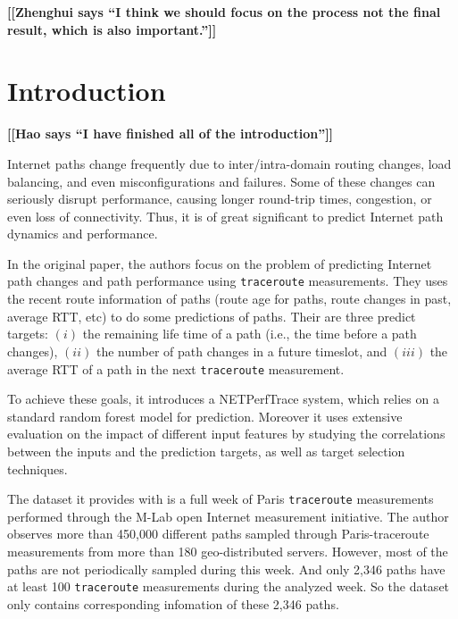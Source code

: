 \documentclass[sigconf]{acmart}
\newcommand{\hao}[1]{{\bf \color{red} [[Hao says ``#1'']]}}
\newcommand{\hui}[1]{{\bf \color{purple} [[Zhenghui says ``#1'']]}}
\begin{document}
	
	
	
	
	\maketitle
	\hui{I think we should focus on the process not the final result, which is also important.}
	\section{Introduction}
	\hao{I have finished all of the introduction}
	
	Internet paths change frequently due to inter/intra-domain routing changes, load balancing, and even misconfigurations and failures. Some of these changes can seriously disrupt performance, causing longer round-trip times, congestion, or even loss of connectivity. Thus, it is of great significant to predict Internet path dynamics and performance.
	
	In the original paper, the authors focus on the problem of predicting Internet path changes and path performance using \texttt{traceroute} measurements. They uses the recent route information of paths (route age for paths, route changes in past, average RTT, etc) to do some predictions of paths. Their are three predict targets: $(i)$ the remaining life time of a path (i.e., the time before a path changes), $(ii)$ the number of path changes in a future timeslot, and $(iii)$ the average RTT of a path in the next \texttt{traceroute} measurement.
	
	To achieve these goals, it introduces a NETPerfTrace system, which relies on a standard random forest model for prediction. Moreover it uses extensive evaluation on the impact of different input features by studying the correlations between the inputs and the prediction targets, as well as target selection techniques.
	
	The dataset it provides with is a full week of Paris \texttt{traceroute} measurements performed through the M-Lab open
	Internet measurement initiative. The author observes more than 450,000 different paths sampled through Paris-traceroute measurements from more than 180 geo-distributed servers. However, most of the paths are not periodically sampled during this week. And only 2,346 paths have at least 100 \texttt{traceroute} measurements during the analyzed week. So the dataset only contains corresponding infomation of these 2,346 paths.
	
\end{document}
